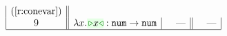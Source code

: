 \begin{figure}[t!]
\[\begin{array}{|c||c|l||l|l|}
\text{(\ref{r:conevar})}
\\ 9 &
\hlam{x}{\zwsel{{x}}} : \tarr{\tnum{}}{\tnum{}} &
\quad\textrm{---}
&
\quad\textrm{---}
\\
\hline


\end{array}\]
\end{figure}
